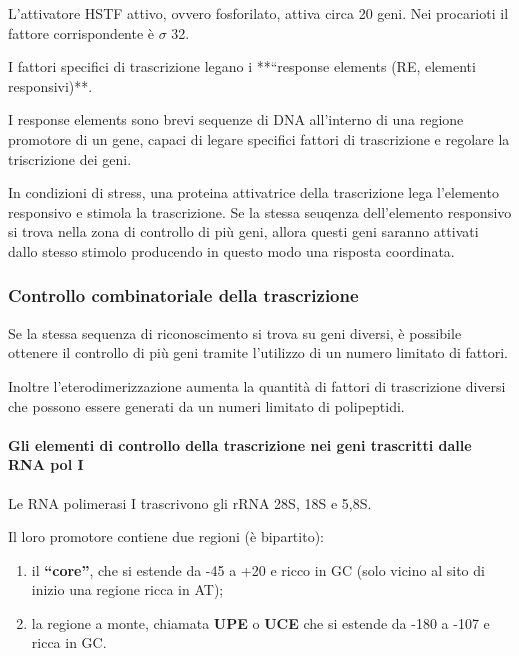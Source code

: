 \documentclass[]{article}
\begin{document}
L'attivatore HSTF attivo, ovvero fosforilato, attiva circa 20 geni. Nei
procarioti il fattore corrispondente è \(\sigma\) 32.

I fattori specifici di trascrizione legano i **``response elements (RE,
elementi responsivi)**.

I response elements sono brevi sequenze di DNA all'interno di una
regione promotore di un gene, capaci di legare specifici fattori di
trascrizione e regolare la triscrizione dei geni.

In condizioni di stress, una proteina attivatrice della trascrizione
lega l'elemento responsivo e stimola la trascrizione. Se la stessa
seuqenza dell'elemento responsivo si trova nella zona di controllo di
più geni, allora questi geni saranno attivati dallo stesso stimolo
producendo in questo modo una risposta coordinata.

\subsubsection{Controllo combinatoriale della
trascrizione}\label{controllo-combinatoriale-della-trascrizione}

Se la stessa sequenza di riconoscimento si trova su geni diversi, è
possibile ottenere il controllo di più geni tramite l'utilizzo di un
numero limitato di fattori.

Inoltre l'eterodimerizzazione aumenta la quantità di fattori di
trascrizione diversi che possono essere generati da un numeri limitato
di polipeptidi.

\paragraph{Gli elementi di controllo della trascrizione nei geni
trascritti dalle RNA pol
I}\label{gli-elementi-di-controllo-della-trascrizione-nei-geni-trascritti-dalle-rna-pol-i}

Le RNA polimerasi I trascrivono gli rRNA 28S, 18S e 5,8S.

Il loro promotore contiene due regioni (è bipartito):

\begin{enumerate}
\def\labelenumi{\arabic{enumi}.}
\itemsep1pt\parskip0pt
\item
  il \textbf{``core''}, che si estende da -45 a +20 e ricco in GC (solo
  vicino al sito di inizio una regione ricca in AT);
\item
  la regione a monte, chiamata \textbf{UPE} o \textbf{UCE} che si
  estende da -180 a -107 e ricca in GC.
\end{enumerate}
\end{document}
